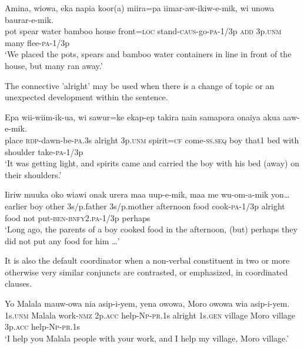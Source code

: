 \ea%
\label{ex:x1375}
\gll Amina,  wiowa,  eka  napia  koor(a)  miira=pa iimar-aw-ikiw-e-mik,    wi  unowa  baurar-e-mik. \\
pot  spear  water  bamboo  house  front=\textsc{loc} stand-\textsc{caus}-go-\textsc{pa}-1/3p  \textsc{add}  3p.\textsc{unm}  many  flee-\textsc{pa}-1/3p    \\
\glt`We placed the pots, spears and bamboo water containers in line in front of the house, but many ran away.'
\z


The connective  'alright' may be used when there is a change of topic or an unexpected development within the sentence.

\ea%
\label{ex:x1376}
\gll Epa  wii-wiim-ik-ua,    wi  sawur=ke  ekap-ep  takira  nain  samapora  onaiya  akua  aaw-e-mik.\\
place  \textsc{rdp}-dawn-be-\textsc{pa}.3s  alright  3p.\textsc{unm}  spirit=\textsc{cf}  come-\textsc{ss}.\textsc{seq} boy  that1  bed  with  shoulder  take-\textsc{pa}-1/3p    \\
\glt`It was getting light, and spirits came and carried the boy with his bed (away) on their shoulders.'
\z


\ea%
\label{ex:x1377}
\gll Iiriw  muuka  oko  wiawi  onak  urera  maa uup-e-mik,    maa  me  wu-om-a-mik  yon{\dots} \\
earlier  boy  other  3s/p.father  3s/p.mother  afternoon  food cook-\textsc{pa}-1/3p  alright  food  not  put-\textsc{ben}-\textsc{bnfy}2.\textsc{pa}-1/3p  perhaps     \\
\glt`Long ago, the parents of a boy cooked food in the afternoon, (but) perhaps they did not put any food for him {\dots}'
\z


It is also the default coordinator when a non-verbal constituent in two or more otherwise very similar conjuncts are contrasted, or emphasized, in coordinated clauses.

\ea%
\label{ex:x1379}
\gll Yo  Malala  mauw-owa  nia  asip-i-yem,   yena  owowa,  Moro  owowa  wia  asip-i-yem.\\
1s.\textsc{unm}  Malala  work-\textsc{nmz}  2p.\textsc{acc}  help-\textsc{Np}-\textsc{pr}.1s  alright 1s.\textsc{gen}  village  Moro  village  3p.\textsc{acc}  help-\textsc{Np}-\textsc{pr}.1s     \\
\glt`I help you Malala people with your work, and I help my village, Moro village.'
\z


